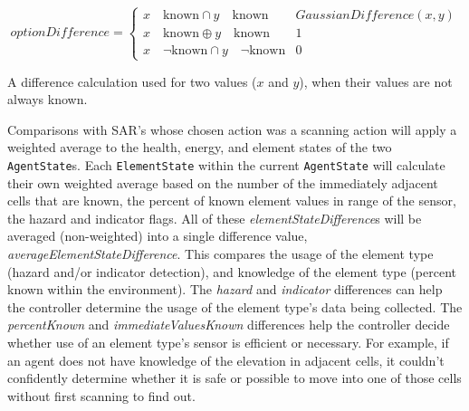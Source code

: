 \begin{capeq}
\begin{equation} \label{eq:option_difference}
  optionDifference =
  \begin{cases}
    x \quad \text{known} \cap y \quad \text{known} & GaussianDifference(x,y) \\
    x \quad \text{known} \oplus y \quad \text{known} & 1 \\
    x \quad \neg \text{known} \cap y \quad \neg \text{known} & 0
  \end{cases}
\end{equation}
\caption{A difference calculation used for two values ($x$ and $y$), when their values are not always known.}
\end{capeq}

Comparisons with SAR's whose chosen action was a scanning action will apply a weighted average to the health, energy, and element states of the two \texttt{AgentState}s.
Each \texttt{ElementState} within the current \texttt{AgentState} will calculate their own weighted average based on the number of the immediately adjacent cells that are known, the percent of known element values in range of the sensor, the hazard and indicator flags.
All of these \textit{elementStateDifference}s will be averaged (non-weighted) into a single difference value, \textit{averageElementStateDifference}.
This compares the usage of the element type (hazard and/or indicator detection), and knowledge of the element type (percent known within the environment).
The \textit{hazard} and \textit{indicator} differences can help the controller determine the usage of the element type's data being collected.
The \textit{percentKnown} and \textit{immediateValuesKnown} differences help the controller decide whether use of an element type's sensor is efficient or necessary.
For example, if an agent does not have knowledge of the elevation in adjacent cells, it couldn't confidently determine whether it is safe or possible to move into one of those cells without first scanning to find out.


